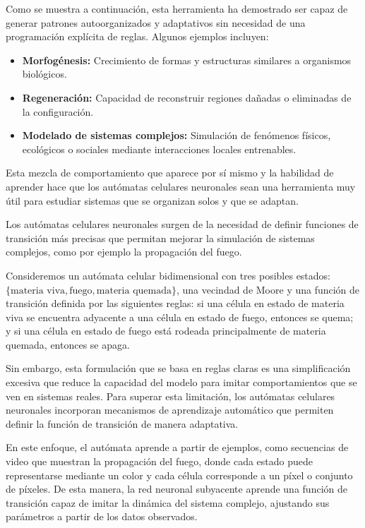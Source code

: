 Como se muestra a continuación, esta herramienta ha demostrado ser capaz de generar patrones autoorganizados y adaptativos sin necesidad de una programación explícita de reglas. Algunos ejemplos incluyen:

\begin{itemize}
	
	\item \textbf{Morfogénesis:} Crecimiento de formas y estructuras similares a organismos biológicos.
	
	\item \textbf{Regeneración:} Capacidad de reconstruir regiones dañadas o eliminadas de la configuración.
	
	\item \textbf{Modelado de sistemas complejos:} Simulación de fenómenos físicos, ecológicos o sociales mediante interacciones locales entrenables.
	
\end{itemize}

Esta mezcla de comportamiento que aparece por sí mismo y la habilidad de aprender hace que los autómatas celulares neuronales sean una herramienta muy útil para estudiar sistemas que se organizan solos y que se adaptan.

Los autómatas celulares neuronales surgen de la necesidad de definir funciones de transición más precisas que permitan mejorar la simulación de sistemas complejos, como por ejemplo la propagación del fuego. 

Consideremos un autómata celular bidimensional con tres posibles estados: $\{ \text{materia viva},\allowbreak \text{fuego},\allowbreak \text{materia quemada} \}$, una vecindad de Moore y una función de transición definida por las siguientes reglas: si una célula en estado de materia viva se encuentra adyacente a una célula en estado de fuego, entonces se quema; y si una célula en estado de fuego está rodeada principalmente de materia quemada, entonces se apaga.

Sin embargo, esta formulación que se basa en reglas claras es una simplificación excesiva que reduce la capacidad del modelo para imitar comportamientos que se ven en sistemas reales. Para superar esta limitación, los autómatas celulares neuronales incorporan mecanismos de aprendizaje automático que permiten definir la función de transición de manera adaptativa. 

En este enfoque, el autómata aprende a partir de ejemplos, como secuencias de video que muestran la propagación del fuego, donde cada estado puede representarse mediante un color y cada célula corresponde a un píxel o conjunto de píxeles. De esta manera, la red neuronal subyacente aprende una función de transición capaz de imitar la dinámica del sistema complejo, ajustando sus parámetros a partir de los datos observados.

